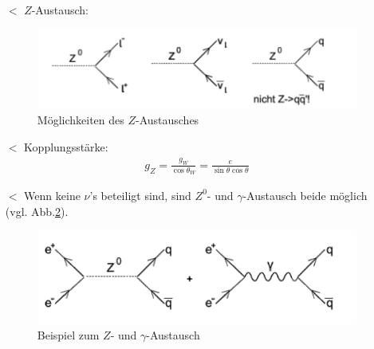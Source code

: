 \begin{itemize}
\item[$\lt$] $Z$-Austausch:

\begin{figure}[!ht]
\centering
\includegraphics[width=.5\textwidth]{imgs/ep5-fig-8-13.pdf}
\caption{Möglichkeiten des $Z$-Austausches \label{fig:8.13}}
\end{figure}

\item[$\lt$] Kopplungsstärke:
\begin{align}
\boxed{g_Z = \frac{g_W}{\cos \theta_W} = \frac{e}{\sin \theta \cos \theta}}
\end{align}
\item[$\lt$] Wenn keine $\nu$'s beteiligt sind, sind $Z^0$- und $\gamma$-Austausch beide möglich (vgl. Abb.\ref{fig:8.14}).

\begin{figure}[!ht]
\centering
\includegraphics[width=.5\textwidth]{imgs/ep5-fig-8-14.pdf}
\caption{Beispiel zum $Z$- und $\gamma$-Austausch \label{fig:8.14}}
\end{figure}


\end{itemize}
